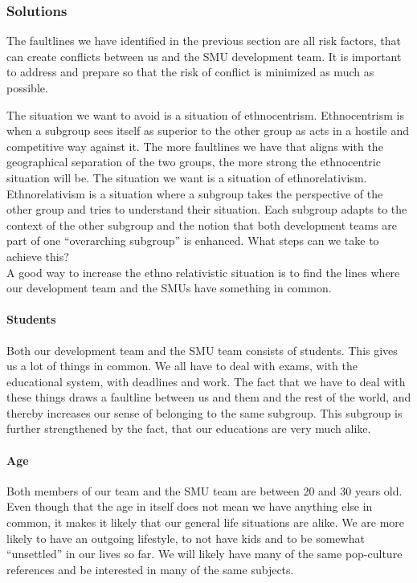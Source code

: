\documentclass[a4paper,11pt,report]{article}
\begin{document}
\subsubsection{Solutions}
The faultlines we have identified in the previous section are all risk factors, that can create conflicts between us and the SMU development team. It is important to address and prepare so that the risk of conflict is minimized as much as possible.

The situation we want to avoid is a situation of ethnocentrism. Ethnocentrism is when a subgroup sees itself as superior to the other group as acts in a hostile and competitive way against it. The more faultlines we have that aligns with the geographical separation of the two groups, the more strong the ethnocentric situation will be. The situation we want is a situation of ethnorelativism\cite{smu}. Ethnorelativism is a situation where a subgroup takes the perspective of the other group and tries to understand their situation. Each subgroup adapts to the context of the other subgroup and the notion that both development teams are part of one “overarching subgroup” is enhanced. What steps can we take to achieve this?\\

A good way to increase the ethno relativistic situation is to find the lines where our development team and the SMUs have something in common. \\

\paragraph{Students}
Both our development team and the SMU team consists of students. This gives us a lot of things in common. We all have to deal with exams, with the educational system, with deadlines and work. The fact that we have to deal with these things draws a faultline between us and them and the rest of the world, and thereby increases our sense of belonging to the same subgroup. This subgroup is further strengthened by the fact, that our educations are very much alike. \\

\paragraph{Age}
Both members of our team and the SMU team are between 20 and 30 years old. Even though that the age in itself does not mean we have anything else in common, it makes it likely that our general life situations are alike. We are more likely to have an outgoing lifestyle, to not have kids and to be somewhat “unsettled” in our lives so far. We will likely have many of the same pop-culture references and be interested in many of the same subjects. 
\end{document}
